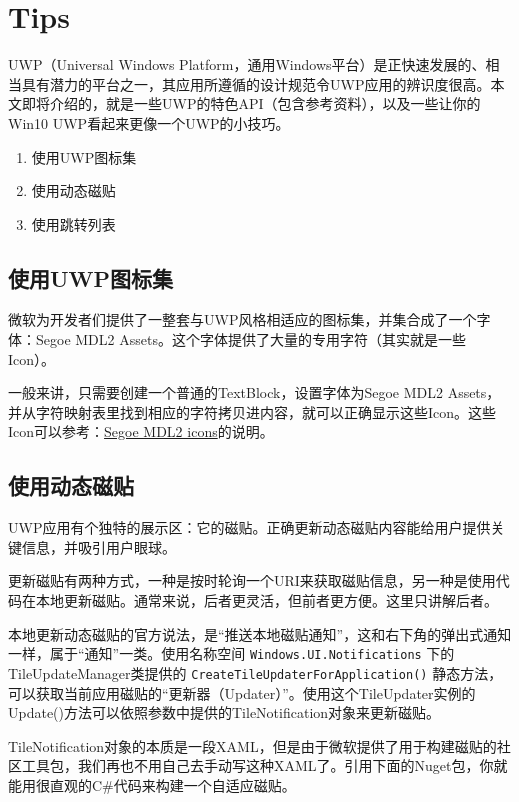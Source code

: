 \chapter{Tips}
	
	UWP（Universal Windows Platform，通用Windows平台）是正快速发展的、相当具有潜力的平台之一，其应用所遵循的设计规范令UWP应用的辨识度很高。本文即将介绍的，就是一些UWP的特色API（包含参考资料），以及一些让你的Win10 UWP看起来更像一个UWP的小技巧。
	
	\begin{enumerate}
		\item 使用UWP图标集
		\item 使用动态磁贴
		\item 使用跳转列表
	\end{enumerate}

\section{使用UWP图标集}

微软为开发者们提供了一整套与UWP风格相适应的图标集，并集合成了一个字体：Segoe MDL2 Assets。这个字体提供了大量的专用字符（其实就是一些Icon）。

一般来讲，只需要创建一个普通的TextBlock，设置字体为Segoe MDL2 Assets，并从字符映射表里找到相应的字符拷贝进内容，就可以正确显示这些Icon。这些Icon可以参考：\href{https://docs.microsoft.com/en-us/windows/uwp/style/segoe-ui-symbol-font}{Segoe MDL2 icons}的说明。

\section{使用动态磁贴}

UWP应用有个独特的展示区：它的磁贴。正确更新动态磁贴内容能给用户提供关键信息，并吸引用户眼球。

更新磁贴有两种方式，一种是按时轮询一个URI来获取磁贴信息，另一种是使用代码在本地更新磁贴。通常来说，后者更灵活，但前者更方便。这里只讲解后者。

本地更新动态磁贴的官方说法，是“推送本地磁贴通知”，这和右下角的弹出式通知一样，属于“通知”一类。使用名称空间 \texttt{Windows.UI.Notifications} 下的TileUpdateManager类提供的 \texttt{CreateTileUpdaterForApplication()} 静态方法，可以获取当前应用磁贴的“更新器（Updater）”。使用这个TileUpdater实例的Update()方法可以依照参数中提供的TileNotification对象来更新磁贴。

TileNotification对象的本质是一段XAML，但是由于微软提供了用于构建磁贴的社区工具包，我们再也不用自己去手动写这种XAML了。引用下面的Nuget包，你就能用很直观的C\#代码来构建一个自适应磁贴。


